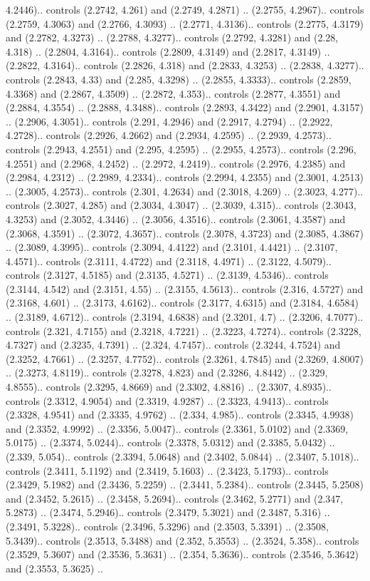 4.2446).. controls (2.2742, 4.261) and (2.2749, 4.2871) .. (2.2755, 4.2967).. controls (2.2759, 4.3063) and (2.2766, 4.3093) .. (2.2771, 4.3136).. controls (2.2775, 4.3179) and (2.2782, 4.3273) .. (2.2788, 4.3277).. controls (2.2792, 4.3281) and (2.28, 4.318) .. (2.2804, 4.3164).. controls (2.2809, 4.3149) and (2.2817, 4.3149) .. (2.2822, 4.3164).. controls (2.2826, 4.318) and (2.2833, 4.3253) .. (2.2838, 4.3277).. controls (2.2843, 4.33) and (2.285, 4.3298) .. (2.2855, 4.3333).. controls (2.2859, 4.3368) and (2.2867, 4.3509) .. (2.2872, 4.353).. controls (2.2877, 4.3551) and (2.2884, 4.3554) .. (2.2888, 4.3488).. controls (2.2893, 4.3422) and (2.2901, 4.3157) .. (2.2906, 4.3051).. controls (2.291, 4.2946) and (2.2917, 4.2794) .. (2.2922, 4.2728).. controls (2.2926, 4.2662) and (2.2934, 4.2595) .. (2.2939, 4.2573).. controls (2.2943, 4.2551) and (2.295, 4.2595) .. (2.2955, 4.2573).. controls (2.296, 4.2551) and (2.2968, 4.2452) .. (2.2972, 4.2419).. controls (2.2976, 4.2385) and (2.2984, 4.2312) .. (2.2989, 4.2334).. controls (2.2994, 4.2355) and (2.3001, 4.2513) .. (2.3005, 4.2573).. controls (2.301, 4.2634) and (2.3018, 4.269) .. (2.3023, 4.277).. controls (2.3027, 4.285) and (2.3034, 4.3047) .. (2.3039, 4.315).. controls (2.3043, 4.3253) and (2.3052, 4.3446) .. (2.3056, 4.3516).. controls (2.3061, 4.3587) and (2.3068, 4.3591) .. (2.3072, 4.3657).. controls (2.3078, 4.3723) and (2.3085, 4.3867) .. (2.3089, 4.3995).. controls (2.3094, 4.4122) and (2.3101, 4.4421) .. (2.3107, 4.4571).. controls (2.3111, 4.4722) and (2.3118, 4.4971) .. (2.3122, 4.5079).. controls (2.3127, 4.5185) and (2.3135, 4.5271) .. (2.3139, 4.5346).. controls (2.3144, 4.542) and (2.3151, 4.55) .. (2.3155, 4.5613).. controls (2.316, 4.5727) and (2.3168, 4.601) .. (2.3173, 4.6162).. controls (2.3177, 4.6315) and (2.3184, 4.6584) .. (2.3189, 4.6712).. controls (2.3194, 4.6838) and (2.3201, 4.7) .. (2.3206, 4.7077).. controls (2.321, 4.7155) and (2.3218, 4.7221) .. (2.3223, 4.7274).. controls (2.3228, 4.7327) and (2.3235, 4.7391) .. (2.324, 4.7457).. controls (2.3244, 4.7524) and (2.3252, 4.7661) .. (2.3257, 4.7752).. controls (2.3261, 4.7845) and (2.3269, 4.8007) .. (2.3273, 4.8119).. controls (2.3278, 4.823) and (2.3286, 4.8442) .. (2.329, 4.8555).. controls (2.3295, 4.8669) and (2.3302, 4.8816) .. (2.3307, 4.8935).. controls (2.3312, 4.9054) and (2.3319, 4.9287) .. (2.3323, 4.9413).. controls (2.3328, 4.9541) and (2.3335, 4.9762) .. (2.334, 4.985).. controls (2.3345, 4.9938) and (2.3352, 4.9992) .. (2.3356, 5.0047).. controls (2.3361, 5.0102) and (2.3369, 5.0175) .. (2.3374, 5.0244).. controls (2.3378, 5.0312) and (2.3385, 5.0432) .. (2.339, 5.054).. controls (2.3394, 5.0648) and (2.3402, 5.0844) .. (2.3407, 5.1018).. controls (2.3411, 5.1192) and (2.3419, 5.1603) .. (2.3423, 5.1793).. controls (2.3429, 5.1982) and (2.3436, 5.2259) .. (2.3441, 5.2384).. controls (2.3445, 5.2508) and (2.3452, 5.2615) .. (2.3458, 5.2694).. controls (2.3462, 5.2771) and (2.347, 5.2873) .. (2.3474, 5.2946).. controls (2.3479, 5.3021) and (2.3487, 5.316) .. (2.3491, 5.3228).. controls (2.3496, 5.3296) and (2.3503, 5.3391) .. (2.3508, 5.3439).. controls (2.3513, 5.3488) and (2.352, 5.3553) .. (2.3524, 5.358).. controls (2.3529, 5.3607) and (2.3536, 5.3631) .. (2.354, 5.3636).. controls (2.3546, 5.3642) and (2.3553, 5.3625) .. 